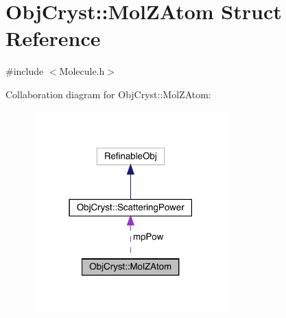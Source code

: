 \hypertarget{struct_obj_cryst_1_1_mol_z_atom}{}\section{Obj\+Cryst\+::Mol\+Z\+Atom Struct Reference}
\label{struct_obj_cryst_1_1_mol_z_atom}


{\ttfamily \#include $<$Molecule.\+h$>$}



Collaboration diagram for Obj\+Cryst\+::Mol\+Z\+Atom\+:
\nopagebreak
\begin{figure}[H]
\begin{center}
\leavevmode
\includegraphics[width=214pt]{struct_obj_cryst_1_1_mol_z_atom__coll__graph}
\end{center}
\end{figure}
